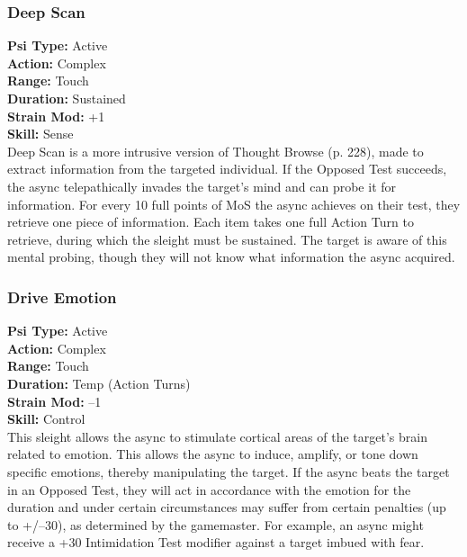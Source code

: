 \subsubsection{Deep Scan} \textbf{Psi Type:} Active \\ \textbf{Action:} Complex \\ \textbf{Range:} Touch \\ \textbf{Duration:} Sustained \\ \textbf{Strain Mod:} +1 \\ \textbf{Skill:} Sense\\ Deep Scan is a more intrusive version of Thought Browse (p. 228), made to extract information from the targeted individual. If the Opposed Test succeeds, the async telepathically invades the target’s mind and can probe it for information. For every 10 full points of MoS the async achieves on their test, they retrieve one piece of information. Each item takes one full Action Turn to retrieve, during which the sleight must be sustained. The target is aware of this mental probing, though they will not know what information the async acquired. 

\subsubsection{Drive Emotion} \textbf{Psi Type:} Active \\ \textbf{Action:} Complex \\ \textbf{Range:} Touch \\ \textbf{Duration:} Temp (Action Turns) \\ \textbf{Strain Mod:} –1 \\ \textbf{Skill:} Control\\ This sleight allows the async to stimulate cortical areas of the target’s brain related to emotion. This allows the async to induce, amplify, or tone down specific emotions, thereby manipulating the target. If the async beats the target in an Opposed Test, they will act in accordance with the emotion for the duration and under certain circumstances may suffer from certain penalties (up to +/–30), as determined by the gamemaster. For example, an async might receive a +30 Intimidation Test modifier against a target imbued with fear. 


